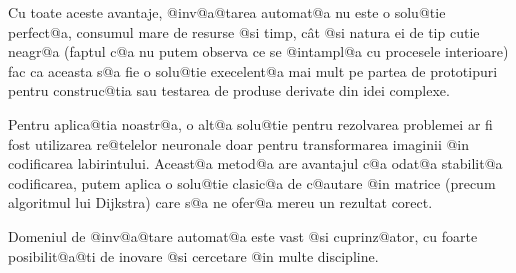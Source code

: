 Cu toate aceste avantaje, @inv@a@tarea automat@a nu este o solu@tie perfect@a, consumul mare de resurse @si timp, c\^ at @si natura ei de tip cutie neagr@a (faptul c@a nu putem observa ce se @intampl@a cu procesele interioare) fac ca aceasta s@a fie o solu@tie execelent@a mai mult pe partea de prototipuri pentru construc@tia sau testarea de produse derivate din idei complexe. 

Pentru aplica@tia noastr@a, o alt@a solu@tie pentru rezolvarea problemei ar fi fost utilizarea re@telelor neuronale doar pentru transformarea imaginii @in codificarea la\-bi\-rin\-tu\-lui. Aceast@a metod@a are avantajul c@a odat@a stabilit@a codificarea, putem aplica o solu@tie clasic@a de c@autare @in matrice (precum algoritmul lui Dijkstra) care s@a ne ofer@a mereu un rezultat corect. 

Domeniul de @inv@a@tare automat@a este vast @si cuprinz@ator, cu foarte posibilit@a@ti de inovare @si cercetare @in multe discipline.
